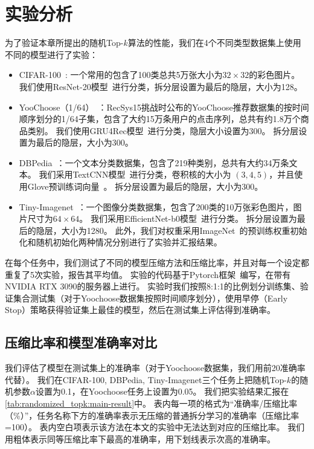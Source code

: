 \section{实验分析}

为了验证本章所提出的随机Top-$k$算法的性能，我们在4个不同类型数据集上使用不同的模型进行了实验：
\begin{itemize}
    \item CIFAR-100~\cite{krizhevsky_2009_cifar}: 一个常用的包含了100类总共5万张大小为$32\times 32$的彩色图片。
        我们使用ResNet-20模型~\cite{hekaiming2016resnet}进行分类，拆分层设置为最后的隐层，大小为128。
    \item YooChoose（1/64）~\cite{ben2015yoochoose,lijing_2017_narm}：RecSys15挑战时公布的YooChoose推荐数据集的按时间顺序划分的1/64子集，包含了大约15万条用户的点击序列，总共有约1.8万个商品类别。
        我们使用GRU4Rec模型~\cite{hidasi_2016_gru4rec}进行分类，隐层大小设置为300。
        拆分层设置为最后的隐层，大小为300。
    \item DBPedia~\cite{2007dbpedia}：一个文本分类数据集，包含了219种类别，总共有大约34万条文本。
        我们采用TextCNN模型~\cite{kimyoon2014textcnn}进行分类，卷积核的大小为 $(3,4,5)$，并且使用Glove预训练词向量~\cite{pennington2014glove}。
        拆分层设置为最后的隐层，大小为300。
    \item Tiny-Imagenet~\cite{tiny-imagenet}：一个图像分类数据集，包含了200类的10万张彩色图片，图片尺寸为$64\times 64$。
        我们采用EfficientNet-b0模型~\cite{tanmingxing2019efficientnet}进行分类。
        拆分层设置为最后的隐层，大小为1280。
        此外，我们对权重采用ImageNet~\cite{2009_imagenet}的预训练权重初始化和随机初始化两种情况分别进行了实验并汇报结果。
\end{itemize}

在每个任务中，我们测试了不同的模型压缩方法和压缩比率，并且对每一个设定都重复了5次实验，报告其平均值。
%
实验的代码基于Pytorch框架~\cite{2019_pytorch}编写，在带有NVIDIA RTX 3090的服务器上进行。
%
实验时我们按照8:1:1的比例划分训练集、验证集合测试集（对于Yoochoose数据集按照时间顺序划分），使用早停（Early Stop）策略获得验证集上最佳的模型，然后在测试集上评估得到准确率。



\subsection{压缩比率和模型准确率对比}
%
我们评估了模型在测试集上的准确率（对于Yoochoose数据集，我们用前20准确率代替）。
%
我们在CIFAR-100, DBPedia, Tiny-Imagenet三个任务上把随机Top-$k$的随机参数$\alpha$设置为0.1，在Yoochoose任务上设置为0.05。
%
我们把实验结果汇报在\autoref{tab:randomized_topk:main-result}中。
表内每一项的格式为“准确率/压缩比率（\%）”，任务名称下方的准确率表示无压缩的普通拆分学习的准确率（压缩比率=100）。
表内空白项表示该方法在本文的实验中无法达到对应的压缩比率。
我们用粗体表示同等压缩比率下最高的准确率，用下划线表示次高的准确率。


